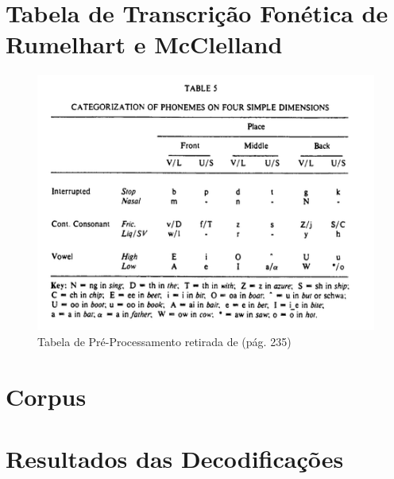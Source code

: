 \documentclass[12pt,twoside,a4paper]{book}
\begin{document}
\appendix

\chapter{Tabela de Transcrição Fonética de Rumelhart e McClelland}
\label{apendice:rumelhart}
\begin{figure}
    \centering
    \includegraphics[scale=0.8]{img/rumelhartpreprocess.png}
    \caption{Tabela de Pré-Processamento retirada de \cite{rumelhart:1986} (pág. 235)}
    \label{fig:preprocess-rumelhart}
\end{figure}

\chapter{Corpus}
\label{ap:corpus}


\chapter{Resultados das Decodificações}
\label{ap:results}


\backmatter





\end{document}
